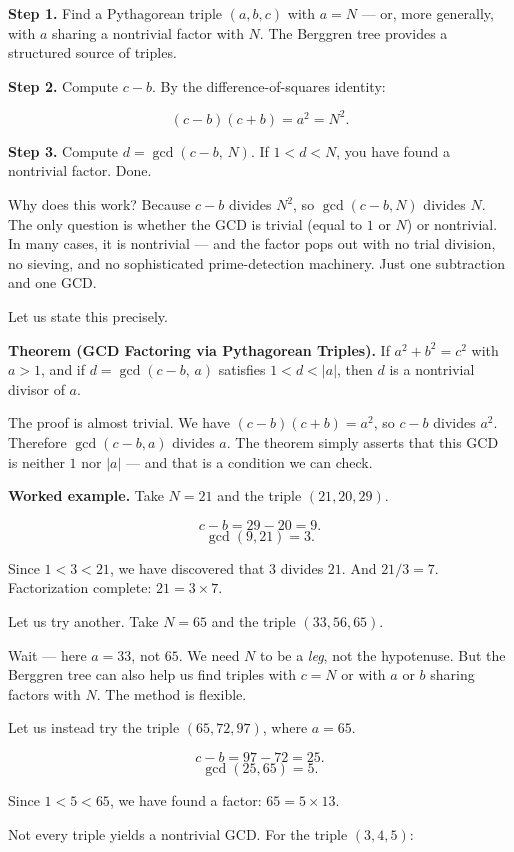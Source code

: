 \documentclass[11pt,openright,twoside]{book}
\theoremstyle{definition}
\begin{document}
\textbf{Step 1.} Find a Pythagorean triple $(a, b, c)$ with $a = N$ --- or, more generally, with $a$ sharing a nontrivial factor with $N$. The Berggren tree provides a structured source of triples.

\textbf{Step 2.} Compute $c - b$. By the difference-of-squares identity:

\[(c - b)(c + b) = a^2 = N^2.\]

\textbf{Step 3.} Compute $d = \gcd(c - b, \, N)$. If $1 < d < N$, you have found a nontrivial factor. Done.

Why does this work? Because $c - b$ divides $N^2$, so $\gcd(c - b, N)$ divides $N$. The only question is whether the GCD is trivial (equal to $1$ or $N$) or nontrivial. In many cases, it is nontrivial --- and the factor pops out with no trial division, no sieving, and no sophisticated prime-detection machinery. Just one subtraction and one GCD.

Let us state this precisely.

\textbf{Theorem (GCD Factoring via Pythagorean Triples).} If $a^2 + b^2 = c^2$ with $a > 1$, and if $d = \gcd(c - b, \, a)$ satisfies $1 < d < |a|$, then $d$ is a nontrivial divisor of $a$.

The proof is almost trivial. We have $(c - b)(c + b) = a^2$, so $c - b$ divides $a^2$. Therefore $\gcd(c - b, a)$ divides $a$. The theorem simply asserts that this GCD is neither $1$ nor $|a|$ --- and that is a condition we can check.

\textbf{Worked example.} Take $N = 21$ and the triple $(21, 20, 29)$.

\[c - b = 29 - 20 = 9.\]
\[\gcd(9, 21) = 3.\]

Since $1 < 3 < 21$, we have discovered that $3$ divides $21$. And $21 / 3 = 7$. Factorization complete: $21 = 3 \times 7$.

Let us try another. Take $N = 65$ and the triple $(33, 56, 65)$.

Wait --- here $a = 33$, not $65$. We need $N$ to be a \textit{leg}, not the hypotenuse. But the Berggren tree can also help us find triples with $c = N$ or with $a$ or $b$ sharing factors with $N$. The method is flexible.

Let us instead try the triple $(65, 72, 97)$, where $a = 65$.

\[c - b = 97 - 72 = 25.\]
\[\gcd(25, 65) = 5.\]

Since $1 < 5 < 65$, we have found a factor: $65 = 5 \times 13$. 

Not every triple yields a nontrivial GCD. For the triple $(3, 4, 5)$:
\end{document}
